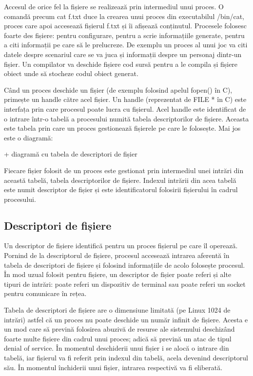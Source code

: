 Accesul de orice fel la fișiere se realizează prin intermediul unui proces. O
comandă precum cat f.txt duce la crearea unui proces din executabilul /bin/cat,
proces care apoi accesează fișierul f.txt și îi afișează conținutul. Procesele
folosesc foarte des fișiere: pentru configurare, pentru a scrie informațiile
generate, pentru a citi informații pe care să le prelucreze. De exemplu un
proces al unui joc va citi datele despre scenariul care se va juca și informații
despre un personaj dintr-un fișier. Un compilator va deschide fișiere cod sursă
pentru a le compila și fișiere obiect unde să stocheze codul obiect generat.

Când un proces deschide un fișier (de exemplu folosind apelul fopen() în C),
primește un handle către acel fișier. Un handle (reprezentat de FILE * în C)
este interfața prin care procesul poate lucra cu fișierul. Acel handle este
identificat de o intrare într-o tabelă a procesului numită tabela descriptorilor
de fișiere. Aceasta este tabela prin care un proces gestionează fișierele pe
care le folosește. Mai jos este o diagramă:

+ diagramă cu tabela de descriptori de fișier

Fiecare fișier folosit de un proces este gestionat prin intermediul unei intrări
din această tabelă, tabela descriptorilor de fișiere. Indexul intrării din acea
tabelă este numit descriptor de fișier și este identificatorul folosirii
fișierului în cadrul procesului.

\subsection{Descriptori de fișiere}
\label{sec:procese-fisiere-description}

Un descriptor de fișiere identifică pentru un proces fișierul pe care îl
operează. Pornind de la descriptorul de fișiere, procesul accesează intrarea
aferentă în tabela de descriptori de fișiere și folosind informațiile de acolo
folosește procesul. În mod uzual folosit pentru fișiere, un descriptor de fișier
poate referi și alte tipuri de intrări: poate referi un dispozitiv de terminal
sau poate referi un socket pentru comunicare în rețea.

Tabela de descriptori de fișiere are o dimensiune limitată (pe Linux 1024 de
intrări) astfel că un proces nu poate deschide un număr infinit de fișiere.
Acesta e un mod care să prevină folosirea abuzivă de resurse ale sistemului
deschizând foarte multe fișiere din cadrul unui proces; adică să prevină un atac
de tipul denial of service. În momentul deschiderii unui fișier i se alocă o
intrare din tabelă, iar fișierul va fi referit prin indexul din tabelă, acela
devenind descriptorul său. În momentul închiderii unui fișier, intrarea
respectivă va fi eliberată.

